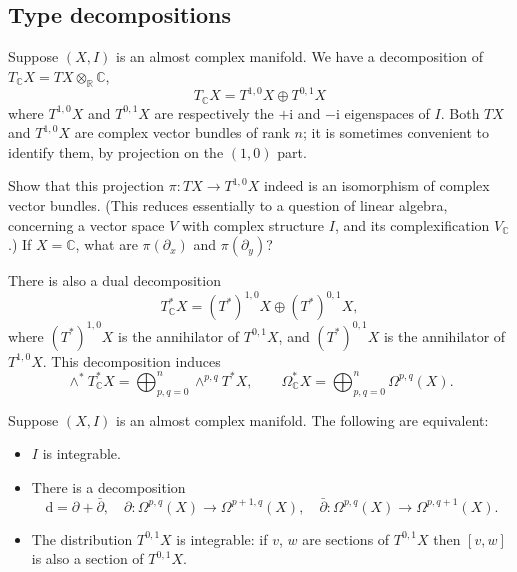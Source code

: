 \documentclass[12pt,letterpaper,reqno]{article}
\numberwithin{equation}{section}
\newcommand{\R}{\ensuremath{\mathbb R}}
\newcommand{\C}{\ensuremath{\mathbb C}}
\newcommand{\I}{{\mathrm i}}
\newcommand{\de}{\mathrm{d}}
\begin{document}
\subsection{Type decompositions}
Suppose $(X,I)$ is an almost complex manifold.
We have a decomposition
of $T_\C X = TX \otimes_\R \C$,
\begin{equation}
T_\C X = T^{1,0} X \oplus T^{0,1} X
  \end{equation}
where $T^{1,0} X$ and $T^{0,1} X$ are 
respectively the
$+\I$ and $-\I$ eigenspaces of $I$.
Both $TX$ and $T^{1,0}X$ are complex vector bundles 
of rank $n$; it is sometimes convenient to identify
them, by projection on the $(1,0)$ part.

\begin{exercise}
Show that this projection $\pi: TX \to T^{1,0}X$ indeed is an isomorphism 
of complex vector bundles. (This reduces essentially
to a question of linear algebra, concerning 
a vector space $V$ with complex structure $I$,
and its complexification $V_\C$.) If $X = \C$, 
what are $\pi(\partial_x)$ and $\pi(\partial_y)$?
\end{exercise}

There is also a dual decomposition
\begin{equation}
T^*_\C X = (T^*)^{1,0} X \oplus (T^*)^{0,1} X,
  \end{equation}
where $(T^*)^{1,0} X$ is the annihilator of
$T^{0,1} X$, and $(T^*)^{0,1} X$ is the annihilator of
$T^{1,0} X$.
This decomposition induces
\begin{equation}
\wedge^* T^*_\C X = \bigoplus_{p,q=0}^n \wedge^{p,q} T^* X , \qquad \Omega^*_\C X = \bigoplus_{p,q=0}^n \Omega^{p,q}(X).
\end{equation}

\begin{prop} \label{prop:integrability}
Suppose $(X,I)$ is an almost complex manifold. The following are equivalent:
\begin{itemize}
\item $I$ is integrable.
\item There is a decomposition
\begin{equation}
\de = \partial + \bar\partial, \quad \partial: \Omega^{p,q}(X) \to \Omega^{p+1,q}(X), \quad \bar\partial: \Omega^{p,q}(X) \to \Omega^{p,q+1}(X).
\end{equation}
\item The distribution $T^{0,1}X$ is integrable: if $v$, $w$ are 
sections of $T^{0,1}X$ then $[v,w]$ is also a section of $T^{0,1}X$.
\end{itemize}
\end{prop}
\end{document}

